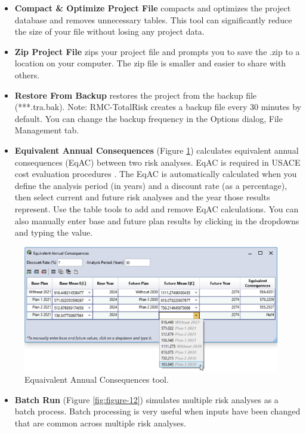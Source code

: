 \documentclass[
]{book}
\providecommand{\tightlist}{%
  \setlength{\itemsep}{0pt}\setlength{\parskip}{0pt}}
\begin{document}
\begin{itemize}
\item
  \textbf{Compact \& Optimize Project File} compacts and optimizes the project database and removes unnecessary tables. This tool can significantly reduce the size of your file without losing any project data.
\item
  \textbf{Zip Project File} zips your project file and prompts you to save the .zip to a location on your computer. The zip file is smaller and easier to share with others.
\item
  \textbf{Restore From Backup} restores the project from the backup file (***.tra.bak). Note: RMC-TotalRisk creates a backup file every 30 minutes by default. You can change the backup frequency in the Options dialog, File Management tab.
\item
  \textbf{Equivalent Annual Consequences} (Figure \ref{fig:figure-11}) calculates equivalent annual consequences (EqAC) between two risk analyses. EqAC is required in USACE cost evaluation procedures \citep{cite-TechRef}. The EqAC is automatically calculated when you define the analysis period (in years) and a discount rate (as a percentage), then select current and future risk analyses and the year those results represent. Use the table tools to add and remove EqAC calculations. You can also manually enter base and future plan results by clicking in the dropdowns and typing the value.
\end{itemize}

\begin{figure}

{\centering \includegraphics{images/figure11} 

}

\caption{Equaivalent Annual Consequences tool.}\label{fig:figure-11}
\end{figure}

\begin{itemize}
\tightlist
\item
  \textbf{Batch Run} (Figure \ref{fig:figure-12}) simulates multiple risk analyses as a batch process. Batch processing is very useful when inputs have been changed that are common across multiple risk analyses.
\end{itemize}
\end{document}
